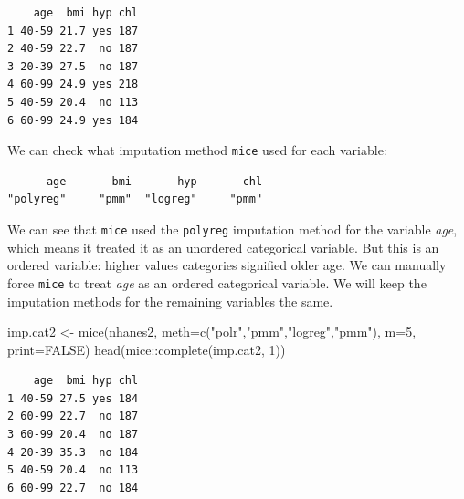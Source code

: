 \documentclass[
  letterpaper,
  DIV=11,
  numbers=noendperiod]{scrreprt}
\newenvironment{Shaded}{\begin{snugshade}}{\end{snugshade}}
\newcommand{\AttributeTok}[1]{\textcolor[rgb]{0.49,0.56,0.16}{#1}}
\newcommand{\ConstantTok}[1]{\textcolor[rgb]{0.53,0.00,0.00}{#1}}
\newcommand{\DecValTok}[1]{\textcolor[rgb]{0.25,0.63,0.44}{#1}}
\newcommand{\FunctionTok}[1]{\textcolor[rgb]{0.02,0.16,0.49}{#1}}
\newcommand{\NormalTok}[1]{\textcolor[rgb]{0.00,0.44,0.13}{#1}}
\newcommand{\OtherTok}[1]{\textcolor[rgb]{0.00,0.44,0.13}{#1}}
\newcommand{\SpecialCharTok}[1]{\textcolor[rgb]{0.25,0.44,0.63}{#1}}
\newcommand{\StringTok}[1]{\textcolor[rgb]{0.25,0.44,0.63}{#1}}
\begin{document}
\begin{verbatim}
    age  bmi hyp chl
1 40-59 21.7 yes 187
2 40-59 22.7  no 187
3 20-39 27.5  no 187
4 60-99 24.9 yes 218
5 40-59 20.4  no 113
6 60-99 24.9 yes 184
\end{verbatim}

We can check what imputation method \texttt{mice} used for each
variable:

\begin{Shaded}
\end{Shaded}

\begin{verbatim}
      age       bmi       hyp       chl 
"polyreg"     "pmm"  "logreg"     "pmm" 
\end{verbatim}

We can see that \texttt{mice} used the \texttt{polyreg} imputation
method for the variable \emph{age}, which means it treated it as an
unordered categorical variable. But this is an ordered variable: higher
values categories signified older age. We can manually force
\texttt{mice} to treat \emph{age} as an ordered categorical variable. We
will keep the imputation methods for the remaining variables the same.

\begin{Shaded}
\begin{Highlighting}[]
\NormalTok{  imp.cat2 }\OtherTok{\textless{}{-}} \FunctionTok{mice}\NormalTok{(nhanes2, }\AttributeTok{meth=}\FunctionTok{c}\NormalTok{(}\StringTok{"polr"}\NormalTok{,}\StringTok{"pmm"}\NormalTok{,}\StringTok{"logreg"}\NormalTok{,}\StringTok{"pmm"}\NormalTok{), }\AttributeTok{m=}\DecValTok{5}\NormalTok{, }\AttributeTok{print=}\ConstantTok{FALSE}\NormalTok{)}
  \FunctionTok{head}\NormalTok{(mice}\SpecialCharTok{::}\FunctionTok{complete}\NormalTok{(imp.cat2, }\DecValTok{1}\NormalTok{))}
\end{Highlighting}
\end{Shaded}

\begin{verbatim}
    age  bmi hyp chl
1 40-59 27.5 yes 184
2 60-99 22.7  no 187
3 60-99 20.4  no 187
4 20-39 35.3  no 184
5 40-59 20.4  no 113
6 60-99 22.7  no 184
\end{verbatim}

\begin{Shaded}
\end{Shaded}
\end{document}
